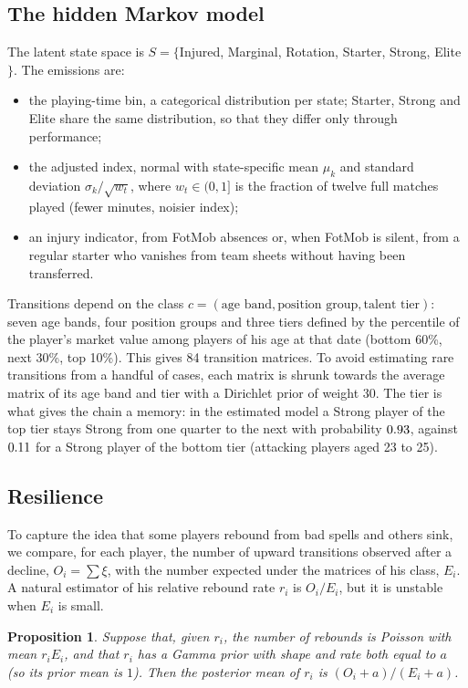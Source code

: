 \documentclass[11pt]{amsart}
\newtheorem{proposition}[theorem]{Proposition}
\theoremstyle{definition}
\theoremstyle{remark}
\begin{document}
\subsection{The hidden Markov model}
The latent state space is $S=\{$Injured, Marginal, Rotation, Starter, Strong, Elite$\}$. The emissions are:
\begin{itemize}
\item the playing-time bin, a categorical distribution per state; Starter, Strong and Elite share the same distribution, so that they differ only through performance;
\item the adjusted index, normal with state-specific mean $\mu_k$ and standard deviation $\sigma_k/\sqrt{w_t}$, where $w_t\in(0,1]$ is the fraction of twelve full matches played (fewer minutes, noisier index);
\item an injury indicator, from FotMob absences or, when FotMob is silent, from a regular starter who vanishes from team sheets without having been transferred.
\end{itemize}
Transitions depend on the class $c=(\text{age band},\text{position group},\text{talent tier})$: seven age bands, four position groups and three tiers defined by the percentile of the player's market value among players of his age at that date (bottom 60\%, next 30\%, top 10\%). This gives 84 transition matrices. To avoid estimating rare transitions from a handful of cases, each matrix is shrunk towards the average matrix of its age band and tier with a Dirichlet prior of weight 30. The tier is what gives the chain a memory: in the estimated model a Strong player of the top tier stays Strong from one quarter to the next with probability $0.93$, against $0.11$ for a Strong player of the bottom tier (attacking players aged 23 to 25).

\subsection{Resilience}
To capture the idea that some players rebound from bad spells and others sink, we compare, for each player, the number of upward transitions observed after a decline, $O_i=\sum\xi$, with the number expected under the matrices of his class, $E_i$. A natural estimator of his relative rebound rate $r_i$ is $O_i/E_i$, but it is unstable when $E_i$ is small.

\begin{proposition}
Suppose that, given $r_i$, the number of rebounds is Poisson with mean $r_iE_i$, and that $r_i$ has a Gamma prior with shape and rate both equal to $a$ (so its prior mean is $1$). Then the posterior mean of $r_i$ is $(O_i+a)/(E_i+a)$.
\end{proposition}
\end{document}
